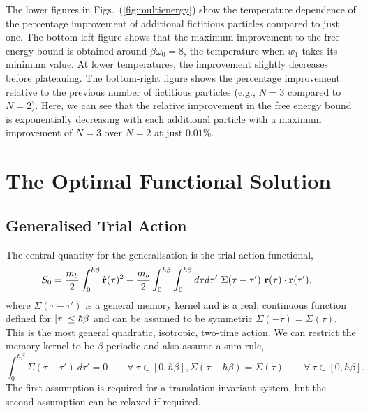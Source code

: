The lower figures in Figs.~(\ref{fig:multienergy}) show the temperature dependence of the percentage improvement of additional fictitious particles compared to just one. The bottom-left figure shows that the maximum improvement to the free energy bound is obtained around $\beta \omega_0 = 8$, the temperature when $w_1$ takes its minimum value. At lower temperatures, the improvement slightly decreases before plateauing. The bottom-right figure shows the percentage improvement relative to the previous number of fictitious particles (e.g., $N = 3$ compared to $N = 2$). Here, we can see that the relative improvement in the free energy bound is exponentially decreasing with each additional particle with a maximum improvement of $N=3$ over $N=2$ at just $0.01$\%.

\section{The Optimal Functional Solution}
\label{sec:chap-fourth-second}

\subsection{Generalised Trial Action}

The central quantity for the generalisation is the trial action functional,
\begin{equation} \label{eqn:generaltrial}
    \begin{aligned}
        S_0 &= \frac{m_b}{2} \int_0^{\hbar\beta} \vb{\Dot{r}}(\tau)^2 - \frac{m_b}{2} \int_0^{\hbar\beta} \int_0^{\hbar\beta} d\tau d\tau'\ \Sigma(\tau - \tau')\ \vb{r}(\tau) \cdot \vb{r}(\tau'),
    \end{aligned}
\end{equation}
where $\Sigma(\tau - \tau')$ is a general memory kernel and is a real, continuous function defined for $\abs{\tau} \leq \hbar\beta$ and can be assumed to be symmetric $\Sigma(-\tau) = \Sigma(\tau)$. This is the most general quadratic, isotropic, two-time action. We can restrict the memory kernel to be $\beta$-periodic and also assume a sum-rule,
\begin{subequations}
    \begin{equation}
        \int_0^{\hbar\beta} \Sigma(\tau - \tau')\ d\tau' = 0 \qquad \forall\ \tau \in [0, \hbar\beta],
    \end{equation}
    \begin{equation}
        \Sigma(\tau - \hbar\beta) = \Sigma(\tau) \qquad \forall\ \tau \in [0, \hbar\beta].
    \end{equation}
\end{subequations}
The first assumption is required for a translation invariant system, but the second assumption can be relaxed if required. 


